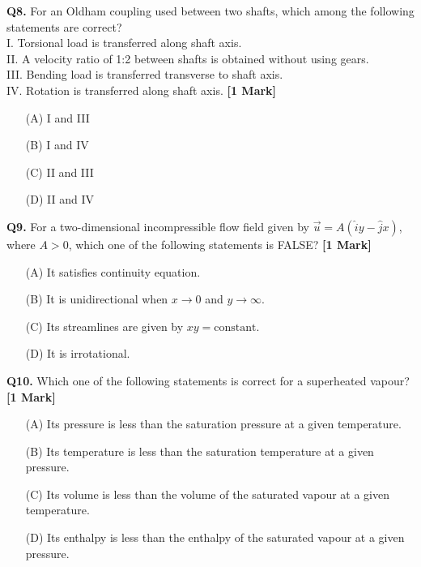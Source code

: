 \documentclass[11pt]{article}
\newcommand{\questiona}[2]{
    \noindent\textbf{Q#2.} #1 \hfill \textbf{[1 Mark]}
}
\begin{document}
\questiona{For an Oldham coupling used between two shafts, which among the following statements are correct? \\
I. Torsional load is transferred along shaft axis. \\
II. A velocity ratio of 1:2 between shafts is obtained without using gears. \\
III. Bending load is transferred transverse to shaft axis. \\
IV. Rotation is transferred along shaft axis.}{8}
\begin{enumerate}
    \item[(A)] I and III
    \item[(B)] I and IV
    \item[(C)] II and III
    \item[(D)] II and IV
\end{enumerate}
\vspace{0.5cm}

\questiona{For a two-dimensional incompressible flow field given by \( \vec{u} = A (\hat{i} y - \hat{j} x) \), where \( A > 0 \), which one of the following statements is FALSE?}{9}
\begin{enumerate}
    \item[(A)] It satisfies continuity equation.
    \item[(B)] It is unidirectional when \( x \rightarrow 0 \) and \( y \rightarrow \infty \).
    \item[(C)] Its streamlines are given by \( xy = \text{constant} \).
    \item[(D)] It is irrotational.
\end{enumerate}
\vspace{0.5cm}

\questiona{Which one of the following statements is correct for a superheated vapour?}{10}
\begin{enumerate}
    \item[(A)] Its pressure is less than the saturation pressure at a given temperature.
    \item[(B)] Its temperature is less than the saturation temperature at a given pressure.
    \item[(C)] Its volume is less than the volume of the saturated vapour at a given temperature.
    \item[(D)] Its enthalpy is less than the enthalpy of the saturated vapour at a given pressure.
\end{enumerate}
\vspace{0.5cm}
\end{document}
